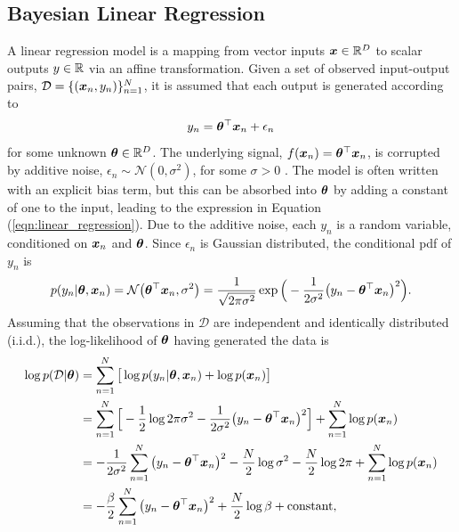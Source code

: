 \documentclass[10pt]{article} %
\begin{document}
\subsection{Bayesian Linear Regression}
\label{sec:bayesian_lr}
A linear regression model is a mapping from vector inputs ${\bm{x}} \in \mathbb{R}^D$ to scalar outputs $y \in \mathbb{R}$ via an affine transformation. Given a set of observed input-output pairs, $\mathcal{D} = \{({\bm{x}}_n, y_n)\}_{n=1}^{N}$, it is assumed that each output is generated according to 
\begin{equation}
\label{eqn:linear_regression}
    y_n = {\bm{\theta}}^\top {\bm{x}}_n + \epsilon_n
\end{equation}
for some unknown ${\bm{\theta}} \in \mathbb{R}^D$. The underlying signal, $f({\bm{x}}_n) = {\bm{\theta}}^\top {\bm{x}}_n$, is corrupted by additive noise, $\epsilon_n \sim \mathcal{N}(0, \sigma^2)$, for some $\sigma > 0$ \citep{barber2007}. The model is often written with an explicit bias term, but this can be absorbed into ${\bm{\theta}}$ by adding a constant of one to the input, leading to the expression in Equation (\ref{eqn:linear_regression}). Due to the additive noise, each $y_n$ is a random variable, conditioned on ${\bm{x}}_n$ and ${\bm{\theta}}$. Since $\epsilon_n$ is Gaussian distributed, the conditional pdf of $y_n$ is 
\begin{equation}
\label{eqn:linear_regression_pdf}
    p(y_n | {\bm{\theta}}, {\bm{x}}_n) = \mathcal{N}\big({\bm{\theta}}^\top {\bm{x}}_n, \sigma^2\big) = \frac{1}{\sqrt{2\pi \sigma^2}} \exp\Big(-\frac{1}{2\sigma^2} \big(y_n - {\bm{\theta}}^\top {\bm{x}}_n \big)^2\Big).
\end{equation}
Assuming that the observations in $\mathcal{D}$ are independent and identically distributed (i.i.d.), the log-likelihood of ${\bm{\theta}}$ having generated the data is 
\begin{align}
\label{eqn:linear_regression_log_likelihood}
\begin{split}
	\log p(\mathcal{D} | {\bm{\theta}}) 
	& = \sum_{n=1}^N \big[ \log p(y_n | {\bm{\theta}}, {\bm{x}}_n)  + \log p({\bm{x}}_n) \big] \\
	& = \sum_{n=1}^N \Big[ -\frac{1}{2} \log 2\pi \sigma^2 - \frac{1}{2\sigma^2} \big(y_n - {\bm{\theta}}^\top {\bm{x}}_n \big)^2 \Big]
	+ \sum_{n=1}^N \log p({\bm{x}}_n) \\
	& = - \frac{1}{2 \sigma^2} \sum_{n=1}^N \big(y_n - {\bm{\theta}}^\top {\bm{x}}_n \big)^2 
	- \frac{N}{2} \log \sigma^2
	- \frac{N}{2} \log 2\pi
	+ \sum_{n=1}^N \log p({\bm{x}}_n) \\
	& = - \frac{\beta}{2} \sum_{n=1}^N \big(y_n - {\bm{\theta}}^\top {\bm{x}}_n \big)^2 
	+ \frac{N}{2} \log \beta
	+ \text{constant},
\end{split}
\end{align}
\end{document}
